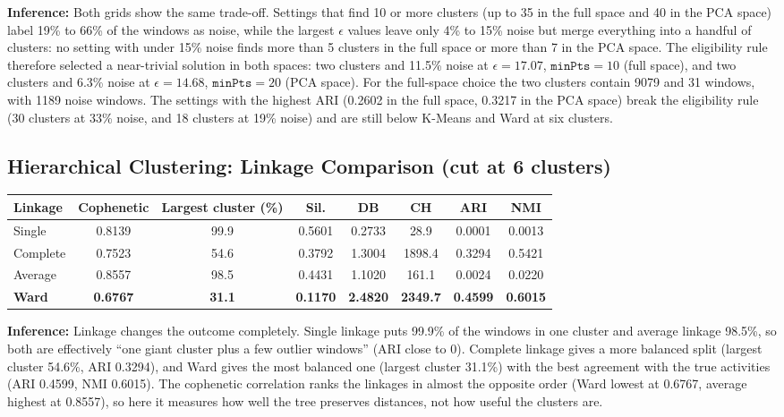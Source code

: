 \documentclass[12pt,a4paper]{article}
\begin{document}
\textbf{Inference:} Both grids show the same trade-off. Settings that find 10 or more clusters
(up to 35 in the full space and 40 in the PCA space) label 19\% to 66\% of the windows as noise,
while the largest $\epsilon$ values leave only 4\% to 15\% noise but merge everything into a
handful of clusters: no setting with under 15\% noise finds more than 5 clusters in the full
space or more than 7 in the PCA space. The eligibility rule therefore selected a near-trivial
solution in both spaces: two
clusters and 11.5\% noise at $\epsilon=17.07$, $\texttt{minPts}=10$ (full space), and two clusters
and 6.3\% noise at $\epsilon=14.68$, $\texttt{minPts}=20$ (PCA space). For the full-space choice
the two clusters contain 9079 and 31 windows, with 1189 noise windows. The settings with the
highest ARI (0.2602 in the full space, 0.3217 in the PCA space) break the eligibility rule
(30 clusters at 33\% noise, and 18 clusters at 19\% noise) and are still below K-Means and Ward
at six clusters.

\subsection*{Hierarchical Clustering: Linkage Comparison (cut at 6 clusters)}
\begin{longtable}{lccccccc}
\toprule
Linkage & Cophenetic & Largest cluster (\%) & Sil. & DB & CH & ARI & NMI \\
\midrule
Single & 0.8139 & 99.9 & 0.5601 & 0.2733 & 28.9 & 0.0001 & 0.0013 \\
Complete & 0.7523 & 54.6 & 0.3792 & 1.3004 & 1898.4 & 0.3294 & 0.5421 \\
Average & 0.8557 & 98.5 & 0.4431 & 1.1020 & 161.1 & 0.0024 & 0.0220 \\
\textbf{Ward} & \textbf{0.6767} & \textbf{31.1} & \textbf{0.1170} & \textbf{2.4820} & \textbf{2349.7} & \textbf{0.4599} & \textbf{0.6015} \\
\bottomrule
\end{longtable}

\textbf{Inference:} Linkage changes the outcome completely. Single linkage puts 99.9\% of the
windows in one cluster and average linkage 98.5\%, so both are effectively ``one giant cluster
plus a few outlier windows'' (ARI close to 0). Complete linkage gives a more balanced split
(largest cluster 54.6\%, ARI 0.3294), and Ward gives the most balanced one (largest cluster
31.1\%) with the best agreement with the true activities (ARI 0.4599, NMI 0.6015). The
cophenetic correlation ranks the linkages in almost the opposite order (Ward lowest at 0.6767,
average highest at 0.8557), so here it measures how well the tree preserves distances, not how
useful the clusters are.
\end{document}
